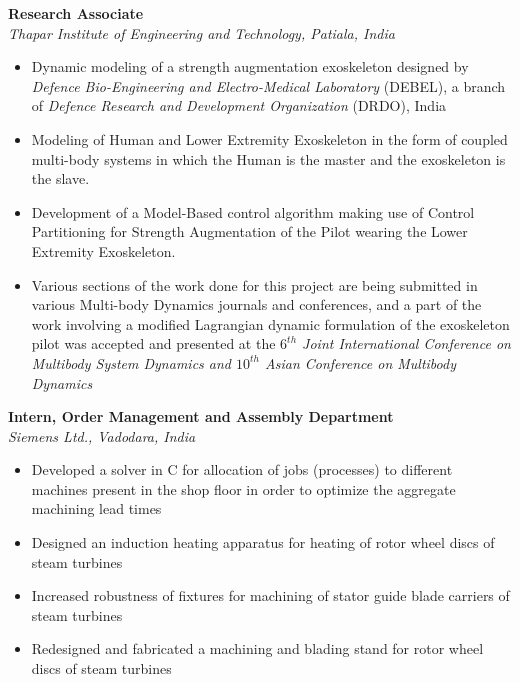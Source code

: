 \large{\textbf{Research Associate}}
\hfill
\drdodate\\
\emph{\large{Thapar Institute of Engineering and Technology, Patiala, India}}
\begin{itemize}
\item \large{Dynamic modeling of a strength augmentation exoskeleton designed by \emph{Defence Bio-Engineering and Electro-Medical Laboratory} (DEBEL), a branch of \emph{Defence Research and Development Organization} (DRDO), India}
\item\large{Modeling of Human and Lower Extremity Exoskeleton in the form of coupled multi-body systems in which the Human is the master and the exoskeleton is the slave.}
\item\large{Development of a Model-Based control algorithm making use of Control Partitioning for Strength Augmentation of the Pilot wearing the Lower Extremity Exoskeleton.}
\item\large{Various sections of the work done for this project are being submitted in various Multi-body Dynamics journals and conferences, and a part of the work involving a modified Lagrangian dynamic formulation of the exoskeleton pilot was accepted and presented at the \emph{$6^{th}$ Joint International Conference on Multibody System Dynamics and $10^{th}$ Asian Conference on Multibody Dynamics}}
\end{itemize}

\vspace{0.1 in}

\large{\textbf{Intern, Order Management and Assembly Department}}
\hfill
\siemensdate\\
\large{\emph{Siemens Ltd., Vadodara, India}}
\begin{itemize}
\item\large{Developed a solver in C for allocation of jobs (processes) to different machines present in the shop floor in order to optimize the aggregate machining lead times}
\item\large{Designed an induction heating apparatus for heating of rotor wheel discs of steam turbines}
\item\large{Increased robustness of fixtures for machining of stator guide blade carriers of steam turbines}
\item\large{Redesigned and fabricated a machining and blading stand for rotor wheel discs of steam turbines }
\end{itemize}

